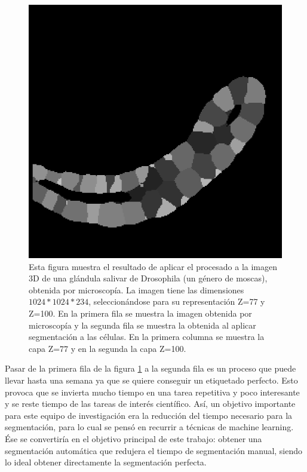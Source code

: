 \begin{figure}[ht]
\includegraphics[scale=0.18]{img/target 04_1a Z=100.png}
\caption[Segmentación de dos capas de una glándula salivar de Drosophila]{Esta figura muestra el resultado de aplicar el procesado a la imagen 3D de una glándula salivar de Drosophila (un género de moscas), obtenida por microscopía. La imagen tiene las dimensiones $1024*1024*234$, seleccionándose para su representación Z=77 y Z=100. En la primera fila se muestra la imagen obtenida por microscopía y la segunda fila se muestra la obtenida al aplicar segmentación a las células. En la primera columna se muestra la capa Z=77 y en la segunda la capa Z=100.}\bigskip
\label{fig:ejemplo1_segmentacion}
\end{figure}

Pasar de la primera fila de la figura \ref{fig:ejemplo1_segmentacion} a la segunda fila es un proceso que puede llevar hasta una semana ya que se quiere conseguir un etiquetado perfecto. Esto provoca que se invierta mucho tiempo en una tarea repetitiva y poco interesante y se reste tiempo de las tareas de interés científico. Así, un objetivo importante para este equipo de investigación era la reducción del tiempo necesario para la segmentación, para lo cual se pensó en recurrir a técnicas de machine learning. Ése se convertiría en el objetivo principal de este trabajo: obtener una segmentación automática que redujera el tiempo de segmentación manual, siendo lo ideal obtener directamente la segmentación perfecta.